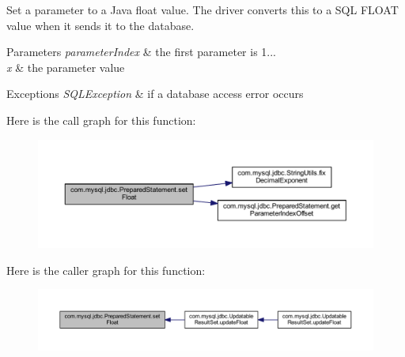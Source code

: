Set a parameter to a Java float value. The driver converts this to a S\+QL F\+L\+O\+AT value when it sends it to the database.


\begin{DoxyParams}{Parameters}
{\em parameter\+Index} & the first parameter is 1... \\
\hline
{\em x} & the parameter value\\
\hline
\end{DoxyParams}

\begin{DoxyExceptions}{Exceptions}
{\em S\+Q\+L\+Exception} & if a database access error occurs \\
\hline
\end{DoxyExceptions}
Here is the call graph for this function\+:
\nopagebreak
\begin{figure}[H]
\begin{center}
\leavevmode
\includegraphics[width=350pt]{classcom_1_1mysql_1_1jdbc_1_1_prepared_statement_a68b6271f340188dc794c5bc4418705cb_cgraph}
\end{center}
\end{figure}
Here is the caller graph for this function\+:
\nopagebreak
\begin{figure}[H]
\begin{center}
\leavevmode
\includegraphics[width=350pt]{classcom_1_1mysql_1_1jdbc_1_1_prepared_statement_a68b6271f340188dc794c5bc4418705cb_icgraph}
\end{center}
\end{figure}
\mbox{\label{classcom_1_1mysql_1_1jdbc_1_1_prepared_statement_ae9efafe8af966733befb3f271c7d902c}} 

